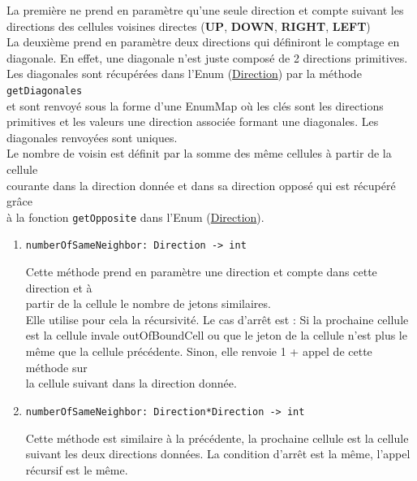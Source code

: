 \documentclass[11pt]{article}
\begin{document}
\begin{enumerate}
La première ne prend en paramètre qu'une seule direction et compte suivant les\\
directions des cellules voisines directes (\textbf{UP}, \textbf{DOWN}, \textbf{RIGHT}, \textbf{LEFT})\\

La deuxième prend en paramètre deux directions qui définiront le comptage en\\
diagonale. En effet, une diagonale n'est juste composé de 2 directions primitives.\\

Les diagonales sont récupérées dans l'Enum (\hyperref[org010dbac]{Direction}) par la méthode \texttt{getDiagonales}\\
et sont renvoyé sous la forme d'une EnumMap où les clés sont les directions\\
primitives et les valeurs une direction associée formant une diagonales. Les\\
diagonales renvoyées sont uniques.\\

Le nombre de voisin est définit par la somme des même cellules à partir de la cellule\\
courante dans la direction donnée et dans sa direction opposé qui est récupéré grâce\\
à la fonction \texttt{getOpposite} dans l'Enum (\hyperref[org010dbac]{Direction}).\\

\begin{enumerate}
\item \texttt{numberOfSameNeighbor: Direction -> int}
\label{sec:org2c5c48f}

Cette méthode prend en paramètre une direction et compte dans cette direction et à\\
partir de la cellule le nombre de jetons similaires.\\

Elle utilise pour cela la récursivité. Le cas d'arrêt est : Si la prochaine cellule\\
est la cellule invale outOfBoundCell ou que le jeton de la cellule n'est plus le\\
même que la cellule précédente. Sinon, elle renvoie 1 + appel de cette méthode sur\\
la cellule suivant dans la direction donnée.\\

\item \texttt{numberOfSameNeighbor: Direction*Direction -> int}
\label{sec:orgcd9ad29}

Cette méthode est similaire à la précédente, la prochaine cellule est la cellule\\
suivant les deux directions données. La condition d'arrêt est la même, l'appel\\
récursif est le même.\\
\end{enumerate}
\end{enumerate}
\end{document}
